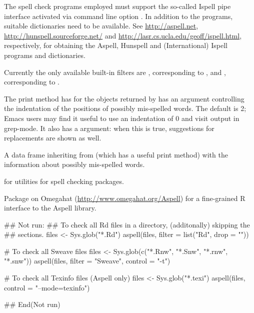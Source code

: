 \begin{Details}\relax
The spell check programs employed must support the so-called Ispell
pipe interface activated via command line option .  In
addition to the programs, suitable dictionaries need to be available.
See \url{http://aspell.net},
\url{http://hunspell.sourceforge.net/} and
\url{http://lasr.cs.ucla.edu/geoff/ispell.html}, respectively, for
obtaining the Aspell, Hunspell and (International) Ispell programs and
dictionaries.

Currently the only available built-in filters are ,
corresponding to , and ,
corresponding to .

The print method has for the objects returned by  has an
 argument controlling the indentation of the positions of
possibly mis-spelled words.  The default is 2; Emacs users may find it
useful to use an indentation of 0 and visit output in grep-mode.  It
also has a  argument: when this is true, suggestions for
replacements are shown as well.
\end{Details}
%
\begin{Value}
A data frame inheriting from  (which has a useful print
method) with the information about possibly mis-spelled words.
\end{Value}
%
\begin{SeeAlso}\relax
{} for utilities for spell checking packages.

Package  on Omegahat
(\url{http://www.omegahat.org/Aspell}) for a fine-grained R interface
to the Aspell library.
\end{SeeAlso}
%
\begin{Examples}
\begin{ExampleCode}
## Not run: 
## To check all Rd files in a directory, (additonally) skipping the
##  sections.
files <- Sys.glob("*.Rd")
aspell(files, filter = list("Rd", drop = ""))

# To check all Sweave files
files <- Sys.glob(c("*.Rnw", "*.Snw", "*.rnw", "*.snw"))
aspell(files, filter = "Sweave", control = "-t")

# To check all Texinfo files (Aspell only)
files <- Sys.glob("*.texi")
aspell(files, control = "--mode=texinfo")

## End(Not run)
\end{ExampleCode}
\end{Examples}
